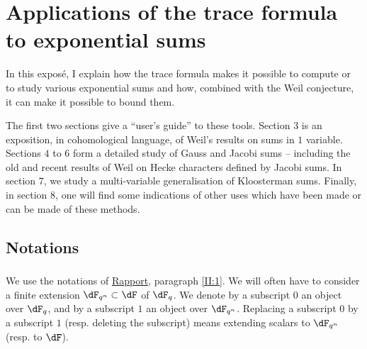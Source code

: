 
\chapter{Applications of the trace formula to exponential sums}\label{VI}










In this exposé, I explain how the trace formula makes it possible to compute
or to study various exponential sums and how, combined with the
Weil conjecture, it can make it possible to bound them.

The first two sections give a ``user's guide'' to these tools. Section 3 is an exposition,
in cohomological language, of Weil's results on sums in $1$ variable. Sections $4$ to $6$ form a
detailed study of Gauss and Jacobi sums -- including the
old and recent results of Weil on Hecke characters
defined by Jacobi sums. In section $7$, we study a
multi-variable generalisation of Kloosterman sums. Finally, in
section $8$, one will find some indications of other uses which have
been made or can be made of these methods. 










\section*{Notations}\label{VI:0}





\subsection{}\label{VI:0-1}

We use the notations of \hyperref[II]{Rapport}, paragraph \ref{II:1}. We
will often have to consider a finite extension $\dF_{q^n}\subset \dF$ of
$\dF_q$. We denote by a subscript $0$ an object over $\dF_q$, and by a subscript $1$
an object over $\dF_{q^n}$. Replacing a subscript $0$ by a subscript $1$ (resp.
deleting the subscript) means extending scalars to $\dF_{q^n}$ (resp.
to $\dF$).





